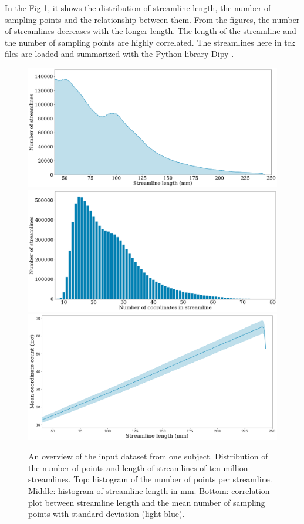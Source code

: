 In the Fig \ref{fig:hist}, it shows the distribution of streamline length, the number of sampling points and the relationship between them.
From the figures, the number of streamlines decreases with the longer length. The length of the streamline and the number of sampling points 
are highly correlated. The streamlines here in tck files are loaded and summarized with the Python library Dipy \cite{garyfallidisDipyLibraryAnalysis2014}.

\begin{figure}[ht]
    \centering
    \includegraphics[width= 13cm]{figures/distribution.png}
    \includegraphics[width= 13cm]{figures/histogram.png}
    \includegraphics[width= 13cm]{figures/length_points.png}
    \caption{An overview of the input dataset from one subject. Distribution of the number of points and length of streamlines of ten million streamlines. 
    Top: histogram of the number of points per streamline. 
    Middle: histogram of streamline length in mm. 
    Bottom: correlation plot between streamline length and the mean number of sampling points with standard deviation (light blue).}
    \label{fig:hist}
\end{figure}

